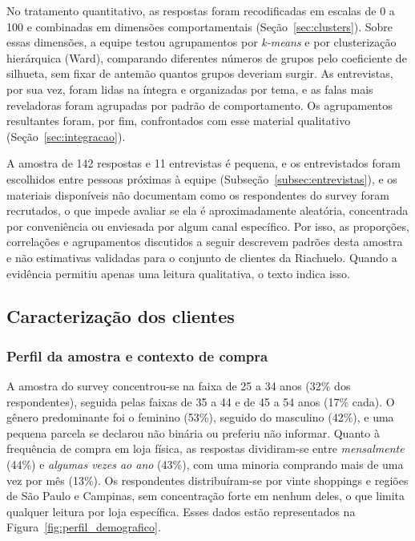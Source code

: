No tratamento quantitativo, as respostas foram recodificadas em escalas de 0 a 100 e combinadas em dimensões comportamentais (Seção~\ref{sec:clusters}). Sobre essas dimensões, a equipe testou agrupamentos por \emph{k-means} e por clusterização hierárquica (Ward), comparando diferentes números de grupos pelo coeficiente de silhueta, sem fixar de antemão quantos grupos deveriam surgir. As entrevistas, por sua vez, foram lidas na íntegra e organizadas por tema, e as falas mais reveladoras foram agrupadas por padrão de comportamento. Os agrupamentos resultantes foram, por fim, confrontados com esse material qualitativo (Seção~\ref{sec:integracao}).

A amostra de 142 respostas e 11 entrevistas é pequena, e os entrevistados foram escolhidos entre pessoas próximas à equipe (Subseção~\ref{subsec:entrevistas}), e os materiais disponíveis não documentam como os respondentes do survey foram recrutados, o que impede avaliar se ela é aproximadamente aleatória, concentrada por conveniência ou enviesada por algum canal específico. Por isso, as proporções, correlações e agrupamentos discutidos a seguir descrevem padrões desta amostra e não estimativas validadas para o conjunto de clientes da Riachuelo. Quando a evidência permitiu apenas uma leitura qualitativa, o texto indica isso.

\subsection{Caracterização dos clientes}
\label{sec:caracterizacao}

\subsubsection{Perfil da amostra e contexto de compra}

A amostra do survey concentrou-se na faixa de 25 a 34 anos (32\% dos respondentes), seguida pelas faixas de 35 a 44 e de 45 a 54 anos (17\% cada). O gênero predominante foi o feminino (53\%), seguido do masculino (42\%), e uma pequena parcela se declarou não binária ou preferiu não informar. Quanto à frequência de compra em loja física, as respostas dividiram-se entre \emph{mensalmente} (44\%) e \emph{algumas vezes ao ano} (43\%), com uma minoria comprando mais de uma vez por mês (13\%). Os respondentes distribuíram-se por vinte shoppings e regiões de São Paulo e Campinas, sem concentração forte em nenhum deles, o que limita qualquer leitura por loja específica. Esses dados estão representados na Figura~\ref{fig:perfil_demografico}.

